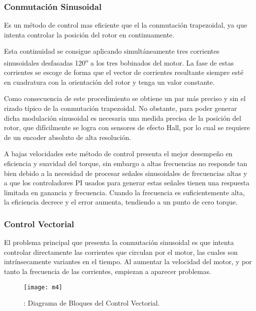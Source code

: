 
\subsubsection{Conmutación Sinusoidal}
\label{subsubsection: conmutacion_sin}

Es un método de control mas eficiente que el la conmutación trapezoidal, ya que intenta controlar la posición del rotor en continuamente.

Esta continuidad se consigue aplicando simultáneamente tres corrientes sinusoidales
desfasadas 120\textsuperscript{o} a los tres bobinados del motor. La fase de estas corrientes se escoge de forma que el vector de corrientes resultante siempre esté en cuadratura con la orientación del rotor y tenga un valor constante.

Como consecuencia de este procedimiento se obtiene un par más preciso y sin el rizado típico de la conmutación trapezoidal. No obstante, para poder generar dicha modulación sinusoidal es necesaria una medida precisa de la posición del rotor, que difícilmente se logra con sensores de efecto Hall, por lo cual se requiere de un encoder absoluto de alta resolución.

A bajas velocidades este método de control presenta el mejor desempeño en eficiencia y suavidad del torque, sin embargo a altas frecuencias no responde tan bien debido a la necesidad de procesar señales sinusoidales de frecuencias altas y a que los controladores PI usados para generar estas señales tienen una respuesta limitada en ganancia y frecuencia. Cuando la frecuencia es suficientemente alta, la eficiencia decrece y el error aumenta, tendiendo a un punto de cero torque.

\subsubsection{Control Vectorial}
\label{subsubsection: control_vectorial}

El problema principal que presenta la conmutación sinusoidal es que intenta controlar directamente las corrientes que circulan por el motor, las cuales son intrínsecamente variantes en el tiempo. Al aumentar la velocidad del motor, y por tanto la frecuencia de las corrientes, empiezan a aparecer problemas.

\begin{figure}[h]
  \centering
  \texttt{[image: m4]}
  \caption{: Diagrama de Bloques del Control Vectorial.}\label{fig:corrientes_bobinas}
\end{figure}

